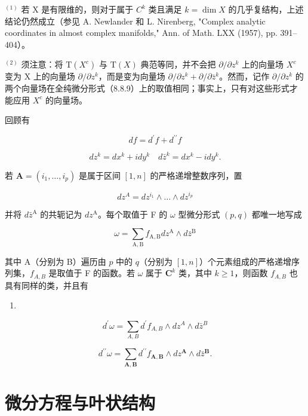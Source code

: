 \(^{(1)}\) 若 X 是有限维的，则对于属于 \(C^k\) 类且满足 \(k = \dim X\) 的几乎复结构，上述结论仍然成立（参见 A. Newlander 和 L. Nirenberg, "Complex analytic coordinates in almost complex manifolds," Ann. of Math. LXX (1957), pp. 391--404）。

\(^{(2)}\) 须注意：将 \(\mathrm{T}(X^c)\) 与 \(\mathrm{T}(X)\) 典范等同，并不会把 \(\partial/\partial z^k\) 上的向量场 \(X^c\) 变为 X 上的向量场 \(\partial/\partial z^k\)，而是变为向量场 \(\partial/\partial z^k+\partial/\partial\bar z^k\)。然而，记作 \(\partial/\partial z^k\) 的两个向量场在全纯微分形式（8.8.9）上的取值相同；事实上，只有对这些形式才能应用 \(X^c\) 的向量场。

回顾有

\[
d f = d ^ {\prime} f + d ^ {\prime \prime} f
\]

\[
d z ^ {k} = d x ^ {k} + i d y ^ {k} \quad d \bar {z} ^ {k} = d x ^ {k} - i d y ^ {k}.
\]

若 \(\mathbf{A}=(i_{1},\ldots,i_{p})\) 是属于区间 \([1,n]\) 的严格递增整数序列，置

\[
d z ^ {A} = d z ^ {i _ {1}} \wedge \dots \wedge d z ^ {i _ {p}}
\]

并将 \(d\bar{z}^{\mathrm{A}}\) 的共轭记为 \(dz^{\mathrm{A}}\)。每个取值于 F 的 \(\omega\) 型微分形式 \((p,q)\) 都唯一地写成

\[
\omega = \sum_ {\mathrm{A}, \mathrm{B}} f _ {\mathrm{A}, \mathrm{B}} d z ^ {\mathrm{A}} \wedge d \bar {z} ^ {\mathrm{B}}\tag{11}
\]

其中 A（分别为 B）遍历由 \(p\) 中的 \(q\)（分别为 \([1, n]\)）个元素组成的严格递增序列集，\(f_{A,B}\) 是取值于 F 的函数。若 \(\omega\) 属于 \(\mathbf{C}^k\) 类，其中 \(k \geqslant 1\)，则函数 \(f_{A,B}\) 也具有同样的类，并且有

\begin{enumerate}
\def\labelenumi{(\arabic{enumi})}
\setcounter{enumi}{11}
\tightlist
\item
\end{enumerate}
\[
d ^ {\prime} \omega = \sum_ {A, B} d ^ {\prime} f _ {A, B} \wedge d z ^ {A} \wedge d \bar {z} ^ {B}\tag{12}
\]

\[
d ^ {\prime \prime} \omega = \sum_ {\mathbf {A}, \mathbf {B}} d ^ {\prime \prime} f _ {\mathbf {A}, \mathbf {B}} \wedge d z ^ {\mathbf {A}} \wedge d \bar {z} ^ {\mathbf {B}}.\tag{13}
\]

\section{微分方程与叶状结构}

